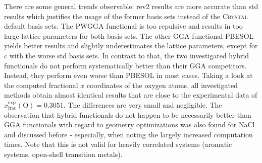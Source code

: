 \documentclass[a4paper,12pt,parskip=half]{scrartcl}
\begin{document}
There are some general trends observable: rev2 results are more accurate than std results which justifies the usage of the former basis sets instead of the \textsc{Crystal} default basis sets. The PWGGA functional is too repulsive and results in too large lattice parameters for both basis sets. The other GGA functional PBESOL yields better results and slightly underestimates the lattice parameters, except for $ c $ with the worse std basis sets. In contrast to that, the two investigated hybrid functionals do not perform systematically better than their GGA competitors. Instead, they perform even worse than PBESOL in most cases. Taking a look at the computed fractional $ x $ coordinates of the oxygen atoms, all investigated methods obtain almost identical results that are close to the experimental data of $x_\mathrm{frac}^\mathrm{exp} \mathrm{(O)} = 0.3051$. The differences are very small and negligible. The observation that hybrid functionals do not happen to be necessarily better than GGA functionals with regard to geometry optimizations was also found for NaCl and discussed before - especially, when noting the largely increased computation times. Note that this is not valid for heavily correlated systems (aromatic systems, open-shell transition metals).
%
\end{document}
